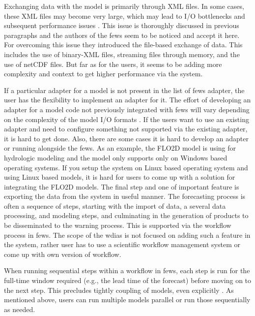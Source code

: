 Exchanging data with the model is primarily through XML files. In some cases, these XML files may become very large, which may lead to I/O bottlenecks and subsequent performance issues \cite{Werner2013TheSystem}. This issue is thoroughly discussed in previous paragraphs and the authors of the \acrshort{fews} \cite{Werner2013TheSystem} seem to be noticed and accept it here. For overcoming this issue they introduced the file-based exchange of data. This includes the use of binary-XML files, streaming files through memory, and the use of \acrshort{netCDF} files. But far as for the users, it seems to be adding more complexity and context to get higher performance via the system.

If a particular adapter for a model is not present in the list of \acrshort{fews} adapter, the user has the flexibility to implement an adapter for it. The effort of developing an adapter for a model code not previously integrated with \acrshort{fews} will vary depending on the complexity of the model I/O formats \cite{Werner2013TheSystem}. If the users want to use an existing adapter and need to configure something not supported via the existing adapter, it is hard to get done. Also, there are some cases it is hard to develop an adapter or running alongside the \acrshort{fews}. As an example, the FLO2D model is using for hydrologic modeling and the model only supports only on Windows based operating systems. If you setup the system on Linux based operating system and using Linux based models, it is hard for users to come up with a solution for integrating the FLO2D models.
The final step and one of important feature is exporting the data from the system in useful manner.
The forecasting process is often a sequence of steps, starting with the import of data, a several data processing, and modeling steps, and culminating in the generation of products to be disseminated to the warning process. This is supported via the workflow process in \acrshort{fews}. The scope of the \acrshort{wdias} is not focused on adding such a feature in the system, rather user has to use a scientific workflow management system or come up with own version of workflow.

When running sequential steps within a workflow in \acrshort{fews}, each step is run for the full-time window required (e.g., the lead time of the forecast) before moving on to the next step. This precludes tightly coupling of models, even explicitly \cite{Werner2013TheSystem}. As mentioned above, users can run multiple models parallel or run those sequentially as needed. 
